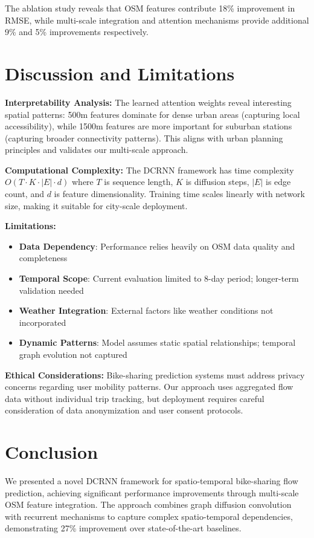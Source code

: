 \documentclass[twocolumn,11pt]{IEEEtran}
\begin{document}
The ablation study reveals that OSM features contribute 18\% improvement in RMSE, while multi-scale integration and attention mechanisms provide additional 9\% and 5\% improvements respectively.

\section{Discussion and Limitations}

\textbf{Interpretability Analysis:}
The learned attention weights reveal interesting spatial patterns: 500m features dominate for dense urban areas (capturing local accessibility), while 1500m features are more important for suburban stations (capturing broader connectivity patterns). This aligns with urban planning principles and validates our multi-scale approach.

\textbf{Computational Complexity:}
The DCRNN framework has time complexity $O(T \cdot K \cdot |E| \cdot d)$ where $T$ is sequence length, $K$ is diffusion steps, $|E|$ is edge count, and $d$ is feature dimensionality. Training time scales linearly with network size, making it suitable for city-scale deployment.

\textbf{Limitations:}
\begin{itemize}
\item \textbf{Data Dependency}: Performance relies heavily on OSM data quality and completeness
\item \textbf{Temporal Scope}: Current evaluation limited to 8-day period; longer-term validation needed
\item \textbf{Weather Integration}: External factors like weather conditions not incorporated
\item \textbf{Dynamic Patterns}: Model assumes static spatial relationships; temporal graph evolution not captured
\end{itemize}

\textbf{Ethical Considerations:}
Bike-sharing prediction systems must address privacy concerns regarding user mobility patterns. Our approach uses aggregated flow data without individual trip tracking, but deployment requires careful consideration of data anonymization and user consent protocols.

\section{Conclusion}

We presented a novel DCRNN framework for spatio-temporal bike-sharing flow prediction, achieving significant performance improvements through multi-scale OSM feature integration. The approach combines graph diffusion convolution with recurrent mechanisms to capture complex spatio-temporal dependencies, demonstrating 27\% improvement over state-of-the-art baselines.
\end{document}
